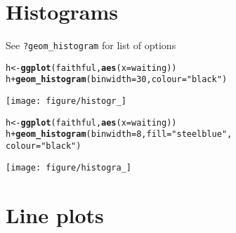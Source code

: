 \documentclass{beamer}\usepackage[]{graphicx}\usepackage[]{color}
\makeatletter
\newcommand{\hlstr}[1]{\textcolor[rgb]{0.192,0.494,0.8}{#1}}%
\newcommand{\hlkwd}[1]{\textcolor[rgb]{0.737,0.353,0.396}{\textbf{#1}}}%
\newenvironment{kframe}{%
 \def\at@end@of@kframe{}%
 \ifinner\ifhmode%
  \def\at@end@of@kframe{\end{minipage}}%
  \begin{minipage}{\columnwidth}%
 \fi\fi%
 \def\FrameCommand##1{\hskip\@totalleftmargin \hskip-\fboxsep
 \colorbox{shadecolor}{##1}\hskip-\fboxsep
     \hskip-\linewidth \hskip-\@totalleftmargin \hskip\columnwidth}%
 \MakeFramed {\advance\hsize-\width
   \@totalleftmargin\z@ \linewidth\hsize
   \@setminipage}}%
 {\par\unskip\endMakeFramed%
 \at@end@of@kframe}
\newenvironment{knitrout}{}{} %
\makeatother
\begin{document}
\section*{Histograms}
\frame{\sectionpage}

\begin{frame}[fragile]
See \texttt{?geom\_histogram} for list of options
\begin{knitrout}\footnotesize
{}\color{fgcolor}\begin{kframe}
\begin{alltt}
h <- \hlkwd{ggplot}(faithful, \hlkwd{aes}(x = waiting))
h + \hlkwd{geom_histogram}(binwidth = 30, colour = \hlstr{"black"})
\end{alltt}
\end{kframe}

{\centering \texttt{[image: figure/histogr\_]} 

}



\end{knitrout}

\end{frame}

\begin{frame}[fragile]
\begin{knitrout}\footnotesize
{}\color{fgcolor}\begin{kframe}
\begin{alltt}
h <- \hlkwd{ggplot}(faithful, \hlkwd{aes}(x = waiting))
h + \hlkwd{geom_histogram}(binwidth = 8, fill = \hlstr{"steelblue"},
colour = \hlstr{"black"})
\end{alltt}
\end{kframe}

{\centering \texttt{[image: figure/histogra\_]} 

}



\end{knitrout}

\end{frame}

\section*{Line plots}
\frame{\sectionpage}
\end{document}
